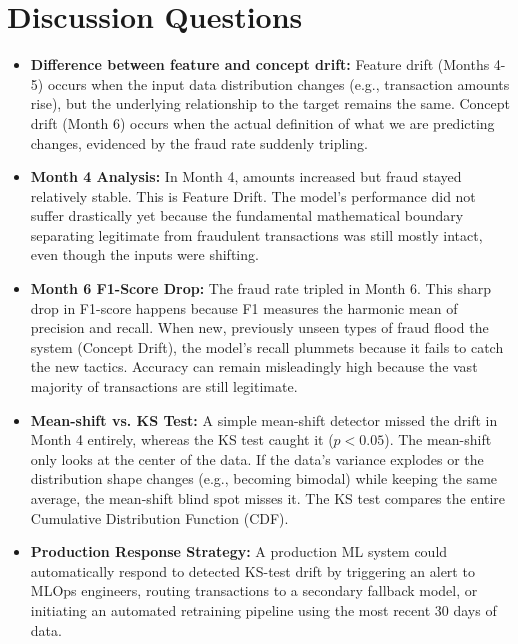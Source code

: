 \documentclass[12pt,a4paper]{article}
\begin{document}

\section*{Discussion Questions}

\begin{itemize}
\item \textbf{Difference between feature and concept drift:} Feature drift (Months 4-5) occurs when the input data distribution changes (e.g., transaction amounts rise), but the underlying relationship to the target remains the same. Concept drift (Month 6) occurs when the actual definition of what we are predicting changes, evidenced by the fraud rate suddenly tripling.

\item \textbf{Month 4 Analysis:} In Month 4, amounts increased but fraud stayed relatively stable. This is Feature Drift. The model's performance did not suffer drastically yet because the fundamental mathematical boundary separating legitimate from fraudulent transactions was still mostly intact, even though the inputs were shifting.

\item \textbf{Month 6 F1-Score Drop:} The fraud rate tripled in Month 6. This sharp drop in F1-score happens because F1 measures the harmonic mean of precision and recall. When new, previously unseen types of fraud flood the system (Concept Drift), the model's recall plummets because it fails to catch the new tactics. Accuracy can remain misleadingly high because the vast majority of transactions are still legitimate.

\item \textbf{Mean-shift vs. KS Test:} A simple mean-shift detector missed the drift in Month 4 entirely, whereas the KS test caught it ($p < 0.05$). The mean-shift only looks at the center of the data. If the data's variance explodes or the distribution shape changes (e.g., becoming bimodal) while keeping the same average, the mean-shift blind spot misses it. The KS test compares the entire Cumulative Distribution Function (CDF).

\item \textbf{Production Response Strategy:} A production ML system could automatically respond to detected KS-test drift by triggering an alert to MLOps engineers, routing transactions to a secondary fallback model, or initiating an automated retraining pipeline using the most recent 30 days of data.
\end{itemize}
\end{document}

